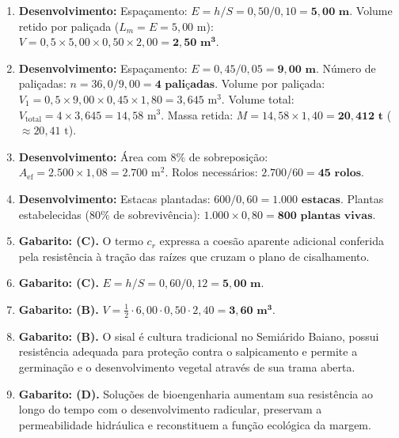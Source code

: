 \begin{boxGabarito}
\begin{enumerate}[leftmargin=1.6em, itemsep=4pt]
  \item \textbf{Desenvolvimento:}
  Espaçamento: $E = h / S = 0{,}50 / 0{,}10 = \mathbf{5{,}00\text{ m}}$.
  Volume retido por paliçada ($L_m = E = 5{,}00\text{ m}$): $V = 0{,}5 \times 5{,}00 \times 0{,}50 \times 2{,}00 = \mathbf{2{,}50\text{ m}^3}$.
  \item \textbf{Desenvolvimento:}
  Espaçamento: $E = 0{,}45 / 0{,}05 = \mathbf{9{,}00\text{ m}}$.
  Número de paliçadas: $n = 36{,}0 / 9{,}00 = \mathbf{4\text{ paliçadas}}$.
  Volume por paliçada: $V_1 = 0{,}5 \times 9{,}00 \times 0{,}45 \times 1{,}80 = 3{,}645\text{ m}^3$.
  Volume total: $V_{\text{total}} = 4 \times 3{,}645 = 14{,}58\text{ m}^3$.
  Massa retida: $M = 14{,}58 \times 1{,}40 = \mathbf{20{,}412\text{ t}}$ ($\approx 20{,}41\text{ t}$).
  \item \textbf{Desenvolvimento:}
  Área com $8\%$ de sobreposição: $A_{\text{ef}} = 2.500 \times 1{,}08 = 2.700\text{ m}^2$.
  Rolos necessários: $2.700 / 60 = \mathbf{45\text{ rolos}}$.
  \item \textbf{Desenvolvimento:}
  Estacas plantadas: $600 / 0{,}60 = \mathbf{1.000\text{ estacas}}$.
  Plantas estabelecidas ($80\%$ de sobrevivência): $1.000 \times 0{,}80 = \mathbf{800\text{ plantas vivas}}$.
  \item \textbf{Gabarito: (C).} O termo $c_r$ expressa a coesão aparente adicional conferida pela resistência à tração das raízes que cruzam o plano de cisalhamento.
  \item \textbf{Gabarito: (C).} $E = h / S = 0{,}60 / 0{,}12 = \mathbf{5{,}00\text{ m}}$.
  \item \textbf{Gabarito: (B).} $V = \frac{1}{2} \cdot 6{,}00 \cdot 0{,}50 \cdot 2{,}40 = \mathbf{3{,}60\text{ m}^3}$.
  \item \textbf{Gabarito: (B).} O sisal é cultura tradicional no Semiárido Baiano, possui resistência adequada para proteção contra o salpicamento e permite a germinação e o desenvolvimento vegetal através de sua trama aberta.
  \item \textbf{Gabarito: (D).} Soluções de bioengenharia aumentam sua resistência ao longo do tempo com o desenvolvimento radicular, preservam a permeabilidade hidráulica e reconstituem a função ecológica da margem.
\end{enumerate}
\end{boxGabarito}

